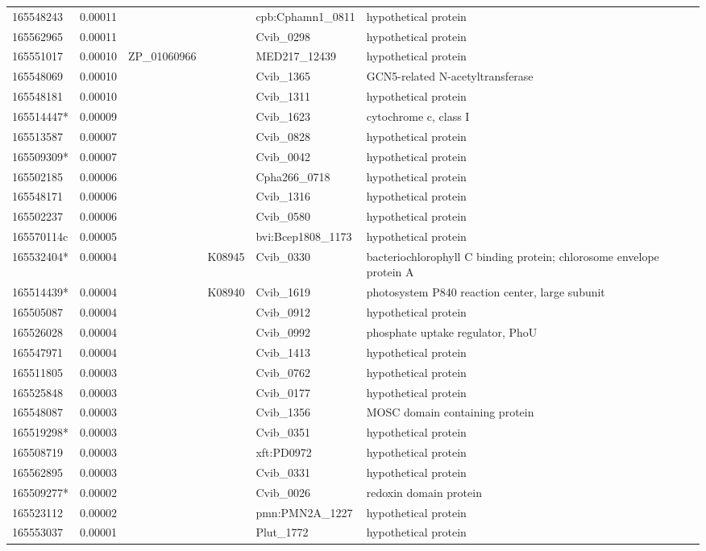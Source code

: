 \begin{landscape}
\begin{longtable}{p{1.6cm}p{1.2cm}p{1.5cm}p{1.5cm}p{2.8cm}p{13.5cm}}
165548243&0.00011&&&cpb:Cphamn1\_0811&hypothetical protein \\
165562965&0.00011&&&Cvib\_0298&hypothetical protein \\
165551017&0.00010&ZP\_01060966&&MED217\_12439&hypothetical protein \\
165548069&0.00010&&&Cvib\_1365&GCN5-related N-acetyltransferase \\
165548181&0.00010&&&Cvib\_1311&hypothetical protein \\
165514447*&0.00009&&&Cvib\_1623&cytochrome c, class I \\
165513587&0.00007&&&Cvib\_0828&hypothetical protein \\
165509309*&0.00007&&&Cvib\_0042&hypothetical protein \\
165502185&0.00006&&&Cpha266\_0718&hypothetical protein \\
165548171&0.00006&&&Cvib\_1316&hypothetical protein \\
165502237&0.00006&&&Cvib\_0580&hypothetical protein \\
165570114c&0.00005&&&bvi:Bcep1808\_1173&hypothetical protein \\
165532404*&0.00004&&K08945&Cvib\_0330&bacteriochlorophyll C binding protein;  chlorosome envelope protein A \\
165514439*&0.00004&&K08940&Cvib\_1619&photosystem P840 reaction center, large subunit \\
165505087&0.00004&&&Cvib\_0912&hypothetical protein \\
165526028&0.00004&&&Cvib\_0992&phosphate uptake regulator, PhoU \\
165547971&0.00004&&&Cvib\_1413&hypothetical protein \\
165511805&0.00003&&&Cvib\_0762&hypothetical protein \\
165525848&0.00003&&&Cvib\_0177&hypothetical protein \\
165548087&0.00003&&&Cvib\_1356&MOSC domain containing protein \\
165519298*&0.00003&&&Cvib\_0351&hypothetical protein \\
165508719&0.00003&&&xft:PD0972&hypothetical protein \\
165562895&0.00003&&&Cvib\_0331&hypothetical protein \\
165509277*&0.00002&&&Cvib\_0026&redoxin domain protein \\
165523112&0.00002&&&pmn:PMN2A\_1227&hypothetical protein \\
165553037&0.00001&&&Plut\_1772&hypothetical protein \\

\end{longtable}
\end{landscape}
